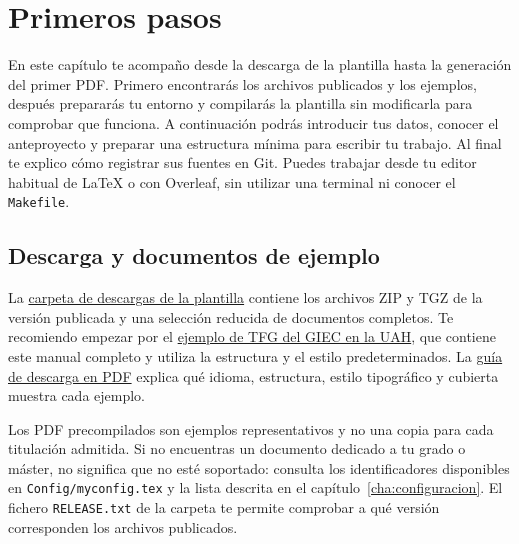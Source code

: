 %

\chapter{Primeros pasos}
\label{cha:primeros-pasos}

En este capítulo te acompaño desde la descarga de la plantilla hasta la generación del primer PDF. Primero encontrarás los archivos publicados y los ejemplos, después prepararás tu entorno y compilarás la plantilla sin modificarla para comprobar que funciona. A continuación podrás introducir tus datos, conocer el anteproyecto y preparar una estructura mínima para escribir tu trabajo. Al final te explico cómo registrar sus fuentes en Git. Puedes trabajar desde tu editor habitual de \LaTeX{} o con Overleaf, sin utilizar una terminal ni conocer el \texttt{Makefile}.

\section{Descarga y documentos de ejemplo}
\label{sec:descarga-ejemplos}

La \href{https://www.dropbox.com/sh/mm6fwh3ruuuyjz2/AABDUmo7Xj1S968FeJgbmFPva?dl=0}{carpeta de descargas de la plantilla} contiene los archivos ZIP y TGZ de la versión publicada y una selección reducida de documentos completos. Te recomiendo empezar por el \href{https://dl.dropboxusercontent.com/scl/fi/wwzbaow0g4cgs7euxvwxy/TFG-GIEC-spanish.pdf?rlkey=2x54yp52avfad67a2fdl3esmv}{ejemplo de TFG del GIEC en la UAH}, que contiene este manual completo y utiliza la estructura y el estilo predeterminados. La \href{https://dl.dropboxusercontent.com/scl/fi/n4jtan9a5v06cc1cp7n4h/01-DOWNLOAD-GUIDE.pdf?rlkey=ux7d8ox85zwlpwhr6nyjvx7zk}{guía de descarga en PDF} explica qué idioma, estructura, estilo tipográfico y cubierta muestra cada ejemplo.

Los PDF precompilados son ejemplos representativos y no una copia para cada titulación admitida. Si no encuentras un documento dedicado a tu grado o máster, no significa que no esté soportado: consulta los identificadores disponibles en \texttt{Config/myconfig.tex} y la lista descrita en el capítulo~\ref{cha:configuracion}. El fichero \texttt{RELEASE.txt} de la carpeta te permite comprobar a qué versión corresponden los archivos publicados.

